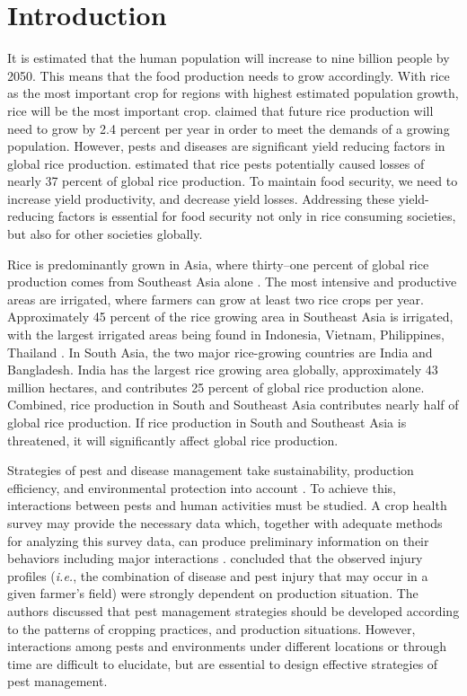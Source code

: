 \section*{Introduction}

It is estimated that the human population will increase to nine billion people by 2050. This means that the food production needs to grow accordingly. With rice as the most important crop for regions with highest estimated population growth, rice will be the most important crop. \citet{Ray_2013_Yield} claimed that future rice production will need to grow by 2.4 percent per year in order to meet the demands of a growing population. However, pests and diseases are significant yield reducing factors in global rice production. \citet{Oerke_2005_Crop} estimated that rice pests potentially caused losses of nearly 37 percent of global rice production. To maintain food security, we need to increase yield productivity, and decrease yield losses. Addressing these yield-reducing factors is essential for food security not only in rice consuming societies, but also for other societies globally. 


Rice is predominantly grown in Asia, where thirty–one percent of global rice production comes from Southeast Asia alone \citep{OECD_2012_Agricultural}. The most intensive and productive areas are irrigated, where farmers can grow at least two rice crops per year. Approximately 45 percent of the rice growing area in Southeast Asia is irrigated, with the largest irrigated areas being found in Indonesia, Vietnam, Philippines, Thailand \citep{Mutert_2002_Developments}. In South Asia, the two major rice-growing countries are India and Bangladesh. India has the largest rice growing area globally, approximately 43 million hectares, and contributes 25 percent of global rice production alone. Combined, rice production in South and Southeast Asia contributes nearly half of global rice production. If rice production in South and Southeast Asia is threatened, it will significantly affect global rice production. 

Strategies of pest and disease management take sustainability, production efficiency, and environmental protection into account \citep{Mew_2004_Looking}. To achieve this, interactions between pests and human activities must be studied. A crop health survey may provide the necessary data which, together with adequate methods for analyzing this survey data, can produce preliminary information on their behaviors including major interactions \citep{Savary_1995_Use}. \citet{Savary_2000_Characterization} concluded that the observed injury profiles (\textit{i.e.}, the combination of disease and pest injury that may occur in a given farmer’s field) were strongly dependent on production situation. The authors discussed that pest management strategies should be developed according to the patterns of cropping practices, and production situations. However, interactions among pests and environments under different locations or through time are difficult to elucidate, but are essential to design effective  strategies of pest management. 


